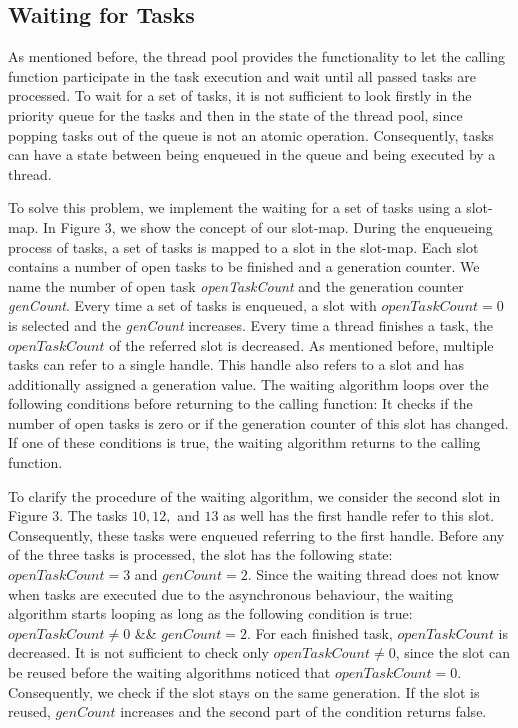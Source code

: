 \documentclass[conference]{IEEEtran}
\begin{document}
\subsection{Waiting for Tasks}
As mentioned before, the thread pool provides the functionality to let the calling function participate in the task execution and wait until all passed tasks are processed. To wait for a set of tasks, it is not sufficient to look firstly in the priority queue for the tasks and then in the state of the thread pool, since popping tasks out of the queue is not an atomic operation. Consequently, tasks can have a state between being enqueued in the queue and being executed by a thread.

To solve this problem, we implement the waiting for a set of tasks using a slot-map. In Figure 3, we show the concept of our slot-map. During the enqueueing process of tasks, a set of tasks is mapped to a slot in the slot-map. Each slot contains a number of open tasks to be finished and a generation counter. We name the number of open task \emph{openTaskCount} and the generation counter \emph{genCount}. Every time a set of tasks is enqueued, a slot with $openTaskCount = 0$ is selected and the \emph{genCount} increases. Every time a thread finishes a task, the $openTaskCount$ of the referred slot is decreased. As mentioned before, multiple tasks can refer to a single handle. This handle also refers to a slot and has additionally assigned a generation value. The waiting algorithm loops over the following conditions before returning to the calling function: It checks if the number of open tasks is zero or if the generation counter of this slot has changed. If one of these conditions is true, the waiting algorithm returns to the calling function.

To clarify the procedure of the waiting algorithm, we consider the second slot in Figure 3. The tasks $10, 12, $ and $13$ as well has the first handle refer to this slot. Consequently, these tasks were enqueued referring to the first handle. Before any of the three tasks is processed, the slot has the following state: $openTaskCount = 3$ and $genCount =  2$. Since the waiting thread does not know when tasks are executed due to the asynchronous behaviour, the waiting algorithm starts looping as long as the following condition is true: $openTaskCount \neq 0$ \&\& $genCount = 2$. For each finished task, $openTaskCount$ is decreased. It is not sufficient to check only $openTaskCount \neq 0$, since the slot can be reused before the waiting algorithms noticed that $openTaskCount = 0$. Consequently, we check if the slot stays on the same generation. If the slot is reused, $genCount$ increases and the second part of the condition returns false.
\end{document}
